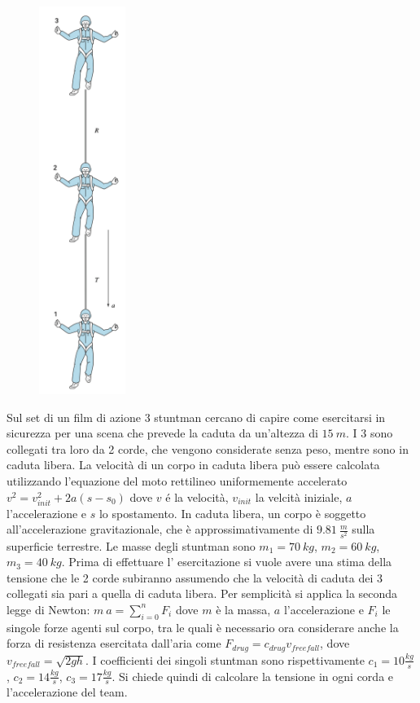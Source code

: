 \documentclass[oneside]{article}
\begin{document}
\begin{figure}
   \centering
   \includegraphics[width=0.25\textwidth]{stuntman.png}
\end{figure}

Sul set di un film di azione 3 stuntman cercano di capire come esercitarsi in sicurezza
per una scena che prevede la caduta da un'altezza di $15 \: m$. I 3 sono collegati tra
loro da 2 corde, che vengono considerate senza peso, mentre sono in caduta libera. La
velocità di un corpo in caduta libera può essere calcolata utilizzando l'equazione del
moto rettilineo uniformemente accelerato $v^2 = v_{init}^2 + 2a(s - s_0)$ dove $v$ é la
velocità, $v_{init}$ la velcità iniziale, $a$ l'accelerazione e $s$ lo spostamento. In
caduta libera, un corpo è soggetto all'accelerazione gravitazionale, che è
approssimativamente di $9.81 \: \frac{m}{s^2}$ sulla superficie terrestre. Le masse degli
stuntman sono $m_1 = 70 \: kg$, $m_2 = 60 \: kg$, $m_3 = 40 \: kg$. Prima di effettuare
l' esercitazione si vuole avere una stima della tensione che le 2 corde subiranno
assumendo che la velocità di caduta dei 3 collegati sia pari a quella di caduta libera.
Per semplicità si applica la seconda legge di Newton: $m \: a = \sum_{i=0}^{n}F_i$ dove
$m$ è la massa, $a$ l'accelerazione e $F_i$ le singole forze agenti sul corpo, tra le
quali è necessario ora considerare anche la forza di resistenza esercitata dall'aria come
$F_{drug} = c_{drug} v_{free fall}$, dove $v_{free fall} = \sqrt{2gh}$. I coefficienti
dei singoli stuntman sono rispettivamente $c_1 = 10 \frac{kg}{s}$, $c_2 = 14
\frac{kg}{s}$, $c_3 = 17 \frac{kg}{s}$. Si chiede quindi di calcolare la tensione in ogni
corda e l'accelerazione del team.
\end{document}
